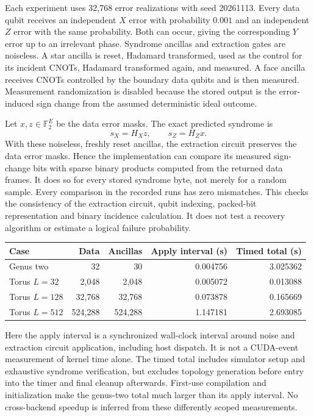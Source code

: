 Each experiment uses 32,768 error realizations with seed 20261113.
Every data qubit receives an independent $X$ error with probability
$0.001$ and an independent $Z$ error with the same probability.  Both
can occur, giving the corresponding $Y$ error up to an irrelevant phase.
Syndrome ancillas and extraction gates are noiseless.  A star ancilla
is reset, Hadamard transformed, used as the control for its incident
CNOTs, Hadamard transformed again, and measured.  A face ancilla receives
CNOTs controlled by the boundary data qubits and is then measured.
Measurement randomization is disabled because the stored output is the
error-induced sign change from the assumed deterministic ideal outcome.

Let $x,z\in\mathbb F_2^E$ be the data error masks.  The exact predicted
syndrome is
\[
 s_X=H_Xz,\qquad s_Z=H_Zx.
\]
With these noiseless, freshly reset ancillas, the extraction circuit
preserves the data error masks.  Hence the implementation can compare
its measured sign-change bits with sparse binary products computed from
the returned data frames.  It does so for every stored syndrome byte,
not merely for a random sample.  Every comparison in the recorded runs
has zero mismatches.  This checks the consistency of the extraction
circuit, qubit indexing, packed-bit representation and binary incidence
calculation.  It does not test a recovery algorithm or estimate a logical
failure probability.

\begin{center}
\begin{tabular}{lrrrr}
\hline
Case & Data & Ancillas & Apply interval (s) & Timed total (s)\\
\hline
Genus two & 32 & 30 & 0.004756 & 3.025362\\
Torus $L=32$ & 2,048 & 2,048 & 0.005072 & 0.013088\\
Torus $L=128$ & 32,768 & 32,768 & 0.073878 & 0.165669\\
Torus $L=512$ & 524,288 & 524,288 & 1.147181 & 2.693085\\
\hline
\end{tabular}
\end{center}

Here the apply interval is a synchronized wall-clock interval around
noise and extraction circuit application, including host dispatch.  It
is not a CUDA-event measurement of kernel time alone.  The timed total
includes simulator setup and exhaustive syndrome verification, but
excludes topology generation before entry into the timer and final
cleanup afterwards.  First-use compilation and initialization make the
genus-two total much larger than its apply interval.  No cross-backend
speedup is inferred from these differently scoped measurements.

